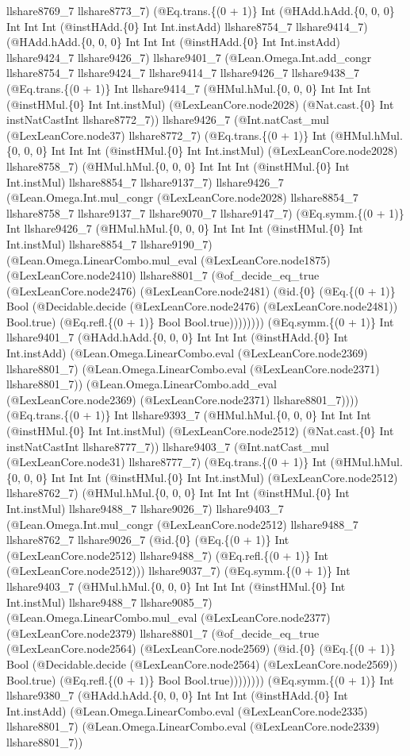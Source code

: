 \documentclass[11pt]{article}
\begin{document}
llshare8769\_7 llshare8773\_7) (@Eq.trans.\{(0 + 1)\} Int (@HAdd.hAdd.\{0, 0, 0\} Int Int Int (@instHAdd.\{0\} Int Int.instAdd) llshare8754\_7 llshare9414\_7) (@HAdd.hAdd.\{0, 0, 0\} Int Int Int (@instHAdd.\{0\} Int Int.instAdd) llshare9424\_7 llshare9426\_7) llshare9401\_7 (@Lean.Omega.Int.add\_congr llshare8754\_7 llshare9424\_7 llshare9414\_7 llshare9426\_7 llshare9438\_7 (@Eq.trans.\{(0 + 1)\} Int llshare9414\_7 (@HMul.hMul.\{0, 0, 0\} Int Int Int (@instHMul.\{0\} Int Int.instMul) (@LexLeanCore.node2028) (@Nat.cast.\{0\} Int instNatCastInt llshare8772\_7)) llshare9426\_7 (@Int.natCast\_mul (@LexLeanCore.node37) llshare8772\_7) (@Eq.trans.\{(0 + 1)\} Int (@HMul.hMul.\{0, 0, 0\} Int Int Int (@instHMul.\{0\} Int Int.instMul) (@LexLeanCore.node2028) llshare8758\_7) (@HMul.hMul.\{0, 0, 0\} Int Int Int (@instHMul.\{0\} Int Int.instMul) llshare8854\_7 llshare9137\_7) llshare9426\_7 (@Lean.Omega.Int.mul\_congr (@LexLeanCore.node2028) llshare8854\_7 llshare8758\_7 llshare9137\_7 llshare9070\_7 llshare9147\_7) (@Eq.symm.\{(0 + 1)\} Int llshare9426\_7 (@HMul.hMul.\{0, 0, 0\} Int Int Int (@instHMul.\{0\} Int Int.instMul) llshare8854\_7 llshare9190\_7) (@Lean.Omega.LinearCombo.mul\_eval (@LexLeanCore.node1875) (@LexLeanCore.node2410) llshare8801\_7 (@of\_decide\_eq\_true (@LexLeanCore.node2476) (@LexLeanCore.node2481) (@id.\{0\} (@Eq.\{(0 + 1)\} Bool (@Decidable.decide (@LexLeanCore.node2476) (@LexLeanCore.node2481)) Bool.true) (@Eq.refl.\{(0 + 1)\} Bool Bool.true)))))))) (@Eq.symm.\{(0 + 1)\} Int llshare9401\_7 (@HAdd.hAdd.\{0, 0, 0\} Int Int Int (@instHAdd.\{0\} Int Int.instAdd) (@Lean.Omega.LinearCombo.eval (@LexLeanCore.node2369) llshare8801\_7) (@Lean.Omega.LinearCombo.eval (@LexLeanCore.node2371) llshare8801\_7)) (@Lean.Omega.LinearCombo.add\_eval (@LexLeanCore.node2369) (@LexLeanCore.node2371) llshare8801\_7)))) (@Eq.trans.\{(0 + 1)\} Int llshare9393\_7 (@HMul.hMul.\{0, 0, 0\} Int Int Int (@instHMul.\{0\} Int Int.instMul) (@LexLeanCore.node2512) (@Nat.cast.\{0\} Int instNatCastInt llshare8777\_7)) llshare9403\_7 (@Int.natCast\_mul (@LexLeanCore.node31) llshare8777\_7) (@Eq.trans.\{(0 + 1)\} Int (@HMul.hMul.\{0, 0, 0\} Int Int Int (@instHMul.\{0\} Int Int.instMul) (@LexLeanCore.node2512) llshare8762\_7) (@HMul.hMul.\{0, 0, 0\} Int Int Int (@instHMul.\{0\} Int Int.instMul) llshare9488\_7 llshare9026\_7) llshare9403\_7 (@Lean.Omega.Int.mul\_congr (@LexLeanCore.node2512) llshare9488\_7 llshare8762\_7 llshare9026\_7 (@id.\{0\} (@Eq.\{(0 + 1)\} Int (@LexLeanCore.node2512) llshare9488\_7) (@Eq.refl.\{(0 + 1)\} Int (@LexLeanCore.node2512))) llshare9037\_7) (@Eq.symm.\{(0 + 1)\} Int llshare9403\_7 (@HMul.hMul.\{0, 0, 0\} Int Int Int (@instHMul.\{0\} Int Int.instMul) llshare9488\_7 llshare9085\_7) (@Lean.Omega.LinearCombo.mul\_eval (@LexLeanCore.node2377) (@LexLeanCore.node2379) llshare8801\_7 (@of\_decide\_eq\_true (@LexLeanCore.node2564) (@LexLeanCore.node2569) (@id.\{0\} (@Eq.\{(0 + 1)\} Bool (@Decidable.decide (@LexLeanCore.node2564) (@LexLeanCore.node2569)) Bool.true) (@Eq.refl.\{(0 + 1)\} Bool Bool.true)))))))) (@Eq.symm.\{(0 + 1)\} Int llshare9380\_7 (@HAdd.hAdd.\{0, 0, 0\} Int Int Int (@instHAdd.\{0\} Int Int.instAdd) (@Lean.Omega.LinearCombo.eval (@LexLeanCore.node2335) llshare8801\_7) (@Lean.Omega.LinearCombo.eval (@LexLeanCore.node2339) llshare8801\_7)) 
\end{document}
